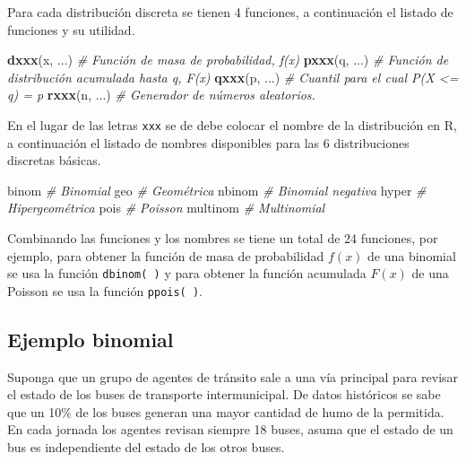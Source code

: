 \documentclass[10pt,]{krantz}
\makeatletter
\newenvironment{Shaded}{\begin{snugshade}}{\end{snugshade}}
\newcommand{\KeywordTok}[1]{\textcolor[rgb]{0.13,0.29,0.53}{\textbf{{#1}}}}
\newcommand{\CommentTok}[1]{\textcolor[rgb]{0.56,0.35,0.01}{\textit{{#1}}}}
\newcommand{\NormalTok}[1]{{#1}}
\let\proglang=\textsf
\newenvironment{kframe}{%
\medskip{}
\setlength{\fboxsep}{.8em}
 \def\at@end@of@kframe{}%
 \ifinner\ifhmode%
  \def\at@end@of@kframe{\end{minipage}}%
  \begin{minipage}{\columnwidth}%
 \fi\fi%
 \def\FrameCommand##1{\hskip\@totalleftmargin \hskip-\fboxsep
 \colorbox{shadecolor}{##1}\hskip-\fboxsep
     \hskip-\linewidth \hskip-\@totalleftmargin \hskip\columnwidth}%
 \MakeFramed {\advance\hsize-\width
   \@totalleftmargin\z@ \linewidth\hsize
   \@setminipage}}%
 {\par\unskip\endMakeFramed%
 \at@end@of@kframe}
\renewenvironment{Shaded}{\begin{kframe}}{\end{kframe}}
\makeatother
\begin{document}
Para cada distribución discreta se tienen 4 funciones, a continuación el
listado de funciones y su utilidad.

\begin{Shaded}
\begin{Highlighting}[]
\KeywordTok{dxxx}\NormalTok{(x, ...)  }\CommentTok{# Función de masa de probabilidad, f(x)}
\KeywordTok{pxxx}\NormalTok{(q, ...)  }\CommentTok{# Función de distribución acumulada hasta q, F(x)}
\KeywordTok{qxxx}\NormalTok{(p, ...)  }\CommentTok{# Cuantil para el cual P(X <= q) = p}
\KeywordTok{rxxx}\NormalTok{(n, ...)  }\CommentTok{# Generador de números aleatorios.}
\end{Highlighting}
\end{Shaded}

En el lugar de las letras \texttt{xxx} se de debe colocar el nombre de
la distribución en \proglang{R}, a continuación el listado de nombres
disponibles para las 6 distribuciones discretas básicas.

\begin{Shaded}
\begin{Highlighting}[]
\NormalTok{binom     }\CommentTok{# Binomial}
\NormalTok{geo       }\CommentTok{# Geométrica}
\NormalTok{nbinom    }\CommentTok{# Binomial negativa}
\NormalTok{hyper     }\CommentTok{# Hipergeométrica}
\NormalTok{pois      }\CommentTok{# Poisson}
\NormalTok{multinom  }\CommentTok{# Multinomial}
\end{Highlighting}
\end{Shaded}

Combinando las funciones y los nombres se tiene un total de 24
funciones, por ejemplo, para obtener la función de masa de probabilidad
\(f(x)\) de una binomial se usa la función \texttt{dbinom(\ )} y para
obtener la función acumulada \(F(x)\) de una Poisson se usa la función
\texttt{ppois(\ )}.

\subsection*{Ejemplo binomial}\label{ejemplo-binomial}


Suponga que un grupo de agentes de tránsito sale a una vía principal
para revisar el estado de los buses de transporte intermunicipal. De
datos históricos se sabe que un 10\% de los buses generan una mayor
cantidad de humo de la permitida. En cada jornada los agentes revisan
siempre 18 buses, asuma que el estado de un bus es independiente del
estado de los otros buses.
\end{document}
